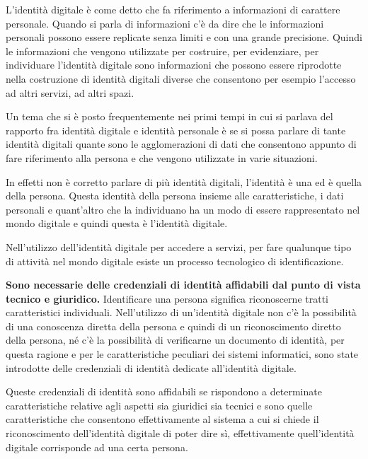 L'identità digitale è come detto che fa riferimento a informazioni di carattere personale. Quando si parla di informazioni c'è da dire che le informazioni personali possono essere replicate senza limiti e con una grande precisione. Quindi le informazioni che vengono utilizzate per costruire, per evidenziare, per individuare l'identità digitale sono informazioni che possono essere riprodotte nella costruzione di identità digitali diverse che consentono per esempio l'accesso ad altri servizi, ad altri spazi.

Un tema che si è posto frequentemente nei primi tempi in cui si parlava del rapporto fra identità digitale e identità personale è se si possa parlare di tante identità digitali quante sono le agglomerazioni di dati che consentono appunto di fare riferimento alla persona e che vengono utilizzate in varie situazioni.%

In effetti non è corretto parlare di più identità digitali, l'identità è una ed è quella della persona. Questa identità della persona insieme alle caratteristiche, i dati personali e quant'altro che la  individuano ha un modo di essere rappresentato nel mondo digitale e quindi questa è l'identità digitale.

Nell'utilizzo dell'identità digitale per accedere a servizi, per fare qualunque tipo di attività nel mondo digitale  esiste un processo tecnologico di identificazione.

\textbf{Sono necessarie delle credenziali di identità affidabili dal punto di vista tecnico e giuridico.} Identificare una persona significa riconoscerne tratti caratteristici individuali. Nell'utilizzo di un'identità digitale non c'è la possibilità di una conoscenza diretta della persona e quindi di un riconoscimento diretto della persona, né c'è la possibilità di verificarne un documento di identità, per questa ragione e per le caratteristiche peculiari dei sistemi informatici, sono state introdotte delle credenziali di identità dedicate all'identità digitale.

Queste credenziali di identità sono affidabili se rispondono a determinate caratteristiche relative agli aspetti sia giuridici sia tecnici e sono quelle caratteristiche che consentono effettivamente al sistema a cui si chiede il riconoscimento dell'identità digitale di poter dire sì, effettivamente quell'identità digitale corrisponde ad una certa persona.

